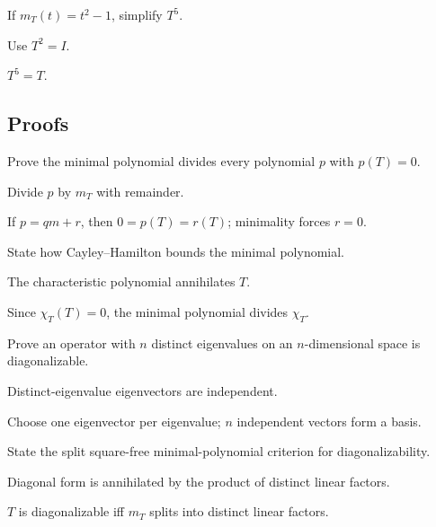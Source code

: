 \begin{exercise}\label{exr:i11-expand-05}
If \(m_T(t)=t^2-1\), simplify \(T^5\).
\end{exercise}
\begin{hint}
Use \(T^2=I\).
\end{hint}
\begin{solution}
\(T^5=T\).
\end{solution}

\subsection*{Proofs}

\begin{exercise}\label{exr:i11-expand-06}
Prove the minimal polynomial divides every polynomial \(p\) with \(p(T)=0\).
\end{exercise}
\begin{hint}
Divide \(p\) by \(m_T\) with remainder.
\end{hint}
\begin{solution}
If \(p=qm+r\), then \(0=p(T)=r(T)\); minimality forces \(r=0\).
\end{solution}

\begin{exercise}\label{exr:i11-expand-07}
State how Cayley--Hamilton bounds the minimal polynomial.
\end{exercise}
\begin{hint}
The characteristic polynomial annihilates \(T\).
\end{hint}
\begin{solution}
Since \(\chi_T(T)=0\), the minimal polynomial divides \(\chi_T\).
\end{solution}

\begin{exercise}\label{exr:i11-expand-08}
Prove an operator with \(n\) distinct eigenvalues on an \(n\)-dimensional space is diagonalizable.
\end{exercise}
\begin{hint}
Distinct-eigenvalue eigenvectors are independent.
\end{hint}
\begin{solution}
Choose one eigenvector per eigenvalue; \(n\) independent vectors form a basis.
\end{solution}

\begin{exercise}\label{exr:i11-expand-09}
State the split square-free minimal-polynomial criterion for diagonalizability.
\end{exercise}
\begin{hint}
Diagonal form is annihilated by the product of distinct linear factors.
\end{hint}
\begin{solution}
\(T\) is diagonalizable iff \(m_T\) splits into distinct linear factors.
\end{solution}

